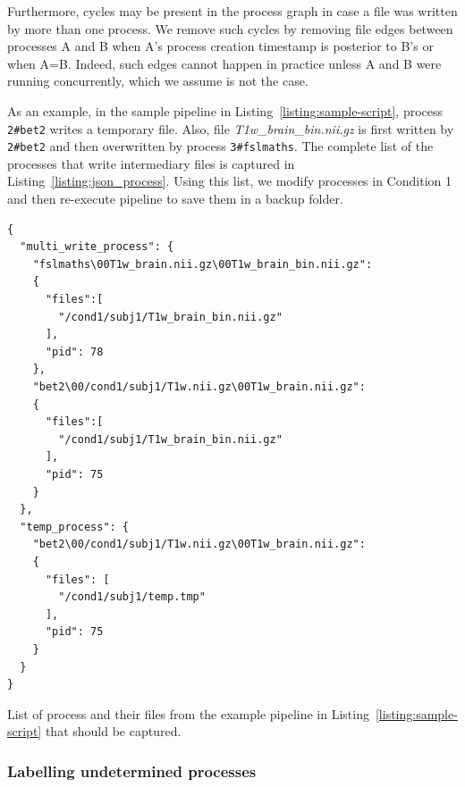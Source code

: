 \documentclass[a4paper,num-refs]{oup-contemporary}
\begin{document}
Furthermore, cycles may be present in the process graph in case a file 
was written by more than one process. We remove such cycles by removing 
file edges between processes A and B when A's process creation 
timestamp is posterior to B's or when A=B. Indeed, such edges cannot 
happen in practice unless A and B were running concurrently, which we 
assume is not the case. 

As an example, in the sample pipeline in Listing~\ref{listing:sample-script}, process \texttt{2\#bet2} writes a temporary file.
Also, file \emph{T1w\_brain\_bin.nii.gz} is first written by \texttt{2\#bet2} and then overwritten by process \texttt{3\#fslmaths}.
The complete list of the processes that write intermediary files is captured in 
Listing~\ref{listing:json_process}.
Using this list, we modify processes in Condition 1 and then re-execute pipeline 
to save them in a backup folder. 

\begin{listing}
  \begin{verbatim}
{
  "multi_write_process": {
    "fslmaths\00T1w_brain.nii.gz\00T1w_brain_bin.nii.gz":
    {
      "files":[
        "/cond1/subj1/T1w_brain_bin.nii.gz"
      ],
      "pid": 78
    },
    "bet2\00/cond1/subj1/T1w.nii.gz\00T1w_brain.nii.gz":
    {
      "files":[
        "/cond1/subj1/T1w_brain_bin.nii.gz"
      ],
      "pid": 75
    }
  },
  "temp_process": {
    "bet2\00/cond1/subj1/T1w.nii.gz\00T1w_brain.nii.gz": 
    {
      "files": [
        "/cond1/subj1/temp.tmp"
      ],
      "pid": 75
    } 
  } 
}

\end{verbatim}
\caption{List of process and their files from the example pipeline in 
Listing~\ref{listing:sample-script} that should be captured.}
\label{listing:json_process}
\end{listing}


\subsubsection{Labelling undetermined processes} 
\end{document}
